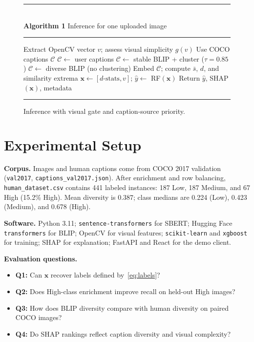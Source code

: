 \documentclass[conference]{IEEEtran}
\begin{document}
\begin{figure}[!t]
\small
\begin{center}
\rule{0.95\linewidth}{0.4pt}\\[2pt]
\textbf{Algorithm 1} Inference for one uploaded image\\[2pt]
\rule{0.95\linewidth}{0.4pt}
\begin{algorithmic}[1]
\STATE Extract OpenCV vector $v$; assess visual simplicity $g(v)$
\STATE Use COCO captions $\mathcal{C}$
\STATE $\mathcal{C} \leftarrow$ user captions
\ELSE
{}
\STATE $\mathcal{C} \leftarrow$ stable BLIP + cluster ($\tau=0.85$)
\ELSE
\STATE $\mathcal{C} \leftarrow$ diverse BLIP (no clustering)
\ENDIF
\ENDIF
\STATE Embed $\mathcal{C}$; compute $\bar{s}$, $d$, and similarity extrema
\STATE $\mathbf{x} \leftarrow [d\text{-stats}, v]$; $\hat{y} \leftarrow$ RF$(\mathbf{x})$
\STATE Return $\hat{y}$, SHAP$(\mathbf{x})$, metadata
\end{algorithmic}
\rule{0.95\linewidth}{0.4pt}
\end{center}
\caption{Inference with visual gate and caption-source priority.}
\label{alg:inference}
\end{figure}

\section{Experimental Setup}
\label{sec:setup}

\textbf{Corpus.} Images and human captions come from COCO 2017 validation (\texttt{val2017}, \texttt{captions\_val2017.json}). After enrichment and row balancing, \texttt{human\_dataset.csv} contains 441 labeled instances: 187 Low, 187 Medium, and 67 High (15.2\% High). Mean diversity is $0.387$; class medians are 0.224 (Low), 0.423 (Medium), and 0.678 (High).

\textbf{Software.} Python 3.11; \texttt{sentence-transformers} for SBERT; Hugging Face \texttt{transformers} for BLIP; OpenCV for visual features; \texttt{scikit-learn} and \texttt{xgboost} for training; SHAP for explanation; FastAPI and React for the demo client.

\textbf{Evaluation questions.}
\begin{itemize}
\item \textbf{Q1:} Can $\mathbf{x}$ recover labels defined by~\eqref{eq:labels}?
\item \textbf{Q2:} Does High-class enrichment improve recall on held-out High images?
\item \textbf{Q3:} How does BLIP diversity compare with human diversity on paired COCO images?
\item \textbf{Q4:} Do SHAP rankings reflect caption diversity and visual complexity?
\end{itemize}
\end{document}
